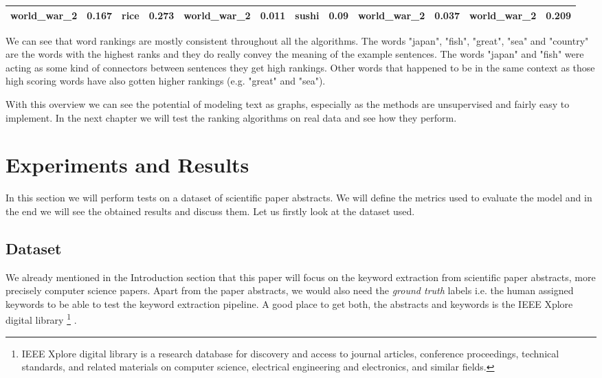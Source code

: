 \documentclass[12pt]{article}
\numberwithin{equation}{section}
\begin{document}
\begin{spacing}{1.5}
\begin{table}[H]
{\begin{tabular}{|cc|cc|cc|cc|cc|cc|}
			\multicolumn{1}{|c|}{world\_war\_2} & 0.167   & \multicolumn{1}{c|}{rice}          & 0.273   & \multicolumn{1}{c|}{world\_war\_2} & 0.011   & \multicolumn{1}{c|}{sushi}         & 0.09    & \multicolumn{1}{c|}{world\_war\_2} & 0.037   & \multicolumn{1}{c|}{world\_war\_2} & 0.209   \\ \hline
		\end{tabular}
	}
	\end{table}
	We can see that word rankings are mostly consistent throughout all the algorithms. The words "japan", "fish", "great", "sea" and "country" are the words with the highest ranks and they do really convey the meaning of the example sentences. The words "japan" and "fish" were acting as some kind of connectors between sentences they get high rankings. Other words that happened to be in the same context as those high scoring words have also gotten higher rankings (e.g. "great" and "sea"). 
	
	With this overview we can see the potential of modeling text as graphs, especially as the methods are unsupervised and fairly easy to implement. In the next chapter we will test the ranking algorithms on real data and see how they perform.
	
	\newpage
	\section{Experiments and Results}
	In this section we will perform tests on a dataset of scientific paper abstracts. We will define the metrics used to evaluate the model and in the end we will see the obtained results and discuss them. Let us firstly look at the dataset used.
	
	\subsection{Dataset}
	We already mentioned in the Introduction section that this paper will focus on the keyword extraction from scientific paper abstracts, more precisely computer science papers. Apart from the paper abstracts, we would also need the \textit{ground truth} labels i.e. the human assigned keywords to be able to test the keyword extraction pipeline. A good place to get both, the abstracts and keywords is the IEEE Xplore digital library \footnote{IEEE Xplore digital library is a research database for discovery and access to journal articles, conference proceedings, technical standards, and related materials on computer science, electrical engineering and electronics, and similar fields.} \cite{ieeexplore}. 
	

\end{spacing}
\end{document}
